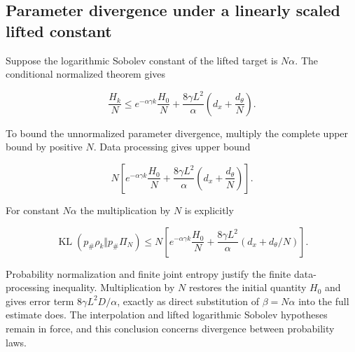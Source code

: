 \documentclass[11pt,a4paper]{report}
\begin{document}
\subsection{\texorpdfstring{Parameter divergence under a linearly scaled lifted constant}{Parameter divergence under a linearly scaled lifted constant}}
\label{report-step-IPLA-LSI-Corollaries-lean-3}


Suppose the logarithmic Sobolev constant of the lifted target is \(N\alpha\). The conditional normalized theorem gives

\[\frac{H_k}{N}\le e^{-\alpha\gamma k}\frac{H_0}{N}+\frac{8\gamma L^2}{\alpha}\left(d_x+\frac{d_\theta}{N}\right).\]

To bound the unnormalized parameter divergence, multiply the complete upper bound by positive \(N\). Data processing gives upper bound

\[N\left[e^{-\alpha\gamma k}\frac{H_0}{N}+\frac{8\gamma L^2}{\alpha}\left(d_x+\frac{d_\theta}{N}\right)\right].\]

For constant \(N\alpha\) the multiplication by \(N\) is explicitly

\[\operatorname{KL}(p_\#\rho_k\Vert p_\#\Pi_N)\le N\left[e^{-\alpha\gamma k}\frac{H_0}{N}+\frac{8\gamma L^2}{\alpha}(d_x+d_\theta/N)\right].\]

Probability normalization and finite joint entropy justify the finite data-processing inequality. Multiplication by \(N\) restores the initial quantity \(H_0\) and gives error term \(8\gamma L^2D/\alpha\), exactly as direct substitution of \(\beta=N\alpha\) into the full estimate does. The interpolation and lifted logarithmic Sobolev hypotheses remain in force, and this conclusion concerns divergence between probability laws.
\end{document}
